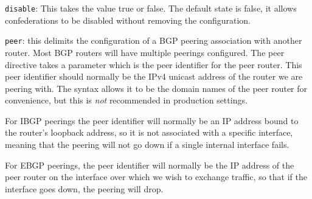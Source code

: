 \begin{description}
\begin{description}
\item{\tt disable}: This takes the value {\stt true} or {\stt
false}. The default state is {\stt false}, it allows confederations
to be disabled without removing the configuration.
\end{description}
\item{\tt peer}: this delimits the configuration of a BGP peering
  association with another router.  Most BGP routers will have
  multiple peerings configured.  The {\stt peer} directive takes a
  parameter which is the peer identifier for the peer router. This
  peer identifier should normally be the IPv4 unicast address of the
  router we are peering with.  The syntax allows it to be the domain
  names of the peer router for convenience, but this is {\it not}
  recommended in production settings.  

  For IBGP peerings the peer identifier will normally be an IP address
  bound to the router's loopback address, so it is not associated with
  a specific interface, meaning that the peering will not go down if a
  single internal interface fails.  

  For EBGP peerings, the peer identifier will normally be the IP
  address of the peer router on the interface over which we wish to
  exchange traffic, so that if the interface goes down, the peering
  will drop.


\end{description}
